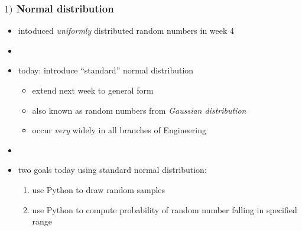 \documentclass[english,14pt]{beamer}
\begin{document}
\begin{frame}[fragile]

\frametitle{$1)$ Normal distribution}

\begin{itemize}
	\item intoduced \emph{uniformly} distributed random numbers in week 4
	
	\item[]
	
	\item today: introduce ``standard'' normal distribution
 	\begin{itemize}
		\item extend next week to general form
		\item also known as random numbers from \emph{Gaussian distribution}
		\item occur \emph{very} widely in all branches of Engineering
	\end{itemize}

	\item[]
	
	\item two goals today using standard normal distribution:
	\begin{enumerate}
		\item use Python to draw random samples
		\item use Python to compute probability of random number falling in specified range
	\end{enumerate}

\end{itemize}

\end{frame}

\end{document}
